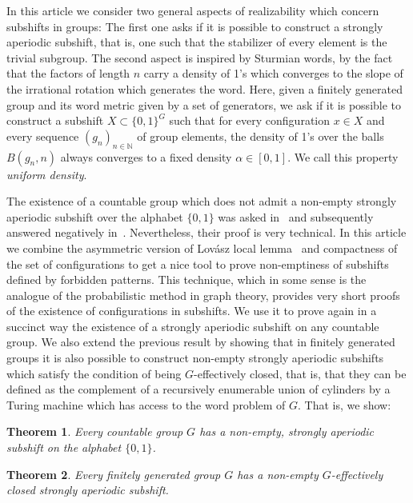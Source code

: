\documentclass[letterpaper]{article}
\theoremstyle{plain}
\newtheorem{theorem}{Theorem}[section]
\def\NN{\mathbb{N}}
\newcommand{\cor}[2][]{#2}
\begin{document}
	\bigskip
	
	In this article we consider two general aspects of realizability which concern subshifts in groups: The first one asks if it is possible to construct a strongly aperiodic subshift, that is, one such that the stabilizer of every element is the trivial subgroup. The second aspect is inspired by Sturmian words, by the fact that the factors of length $n$ carry a density of 1's which converges to the slope of the irrational rotation which generates the word. Here, given a finitely generated group and its word metric given by a set of generators, we ask if \cor[it's]{it is} possible to construct a subshift $X \subset \{0,1\}^G$ such that for every configuration $x \in X$ and every sequence $(g_n)_{n \in \NN}$ of group elements, the density of 1's over the balls $B(g_n,n)$ always converges to a fixed density $\alpha \in [0,1].$ We call this property \emph{uniform density}.
	
	The existence of a countable group which does not admit a non-empty strongly aperiodic subshift over the alphabet $\{0,1\}$ was asked in~\cite{glasner2009} and subsequently answered negatively in~\cite{gao2009}. Nevertheless, their proof is very technical. In this article we combine the asymmetric version of Lov\'asz local lemma~\cite{AlonSpencer2008} and compactness of the set of configurations to get a nice tool to prove non-emptiness of subshifts defined by forbidden patterns. This technique, which in some sense is the analogue of the probabilistic method in graph theory, provides very short proofs of the existence of configurations in subshifts. We use it to prove again in a succinct way the existence of a strongly aperiodic subshift on any countable group. We also extend the previous result by showing that in finitely generated groups it is also possible to construct non-empty strongly aperiodic subshifts which satisfy the condition of being $G$-effectively closed, that is, that they can be defined as 
the complement of a recursively enumerable union of cylinders by a Turing machine which has access to the word problem of $G$. That is, we show:
	
	
	{
		\renewcommand{\thetheorem}{\ref{theorem.free_subflow}}
		\begin{theorem}
		Every countable group $G$ has a non-empty, strongly aperiodic subshift on the alphabet $\{0,1\}$.
		\end{theorem}
		\addtocounter{theorem}{-1}
	}
	
	
	{
		\renewcommand{\thetheorem}{\ref{theorem.strongly_aperiodic1}}
		\begin{theorem}
			Every finitely generated group $G$ has a non-empty $G$-effectively closed strongly aperiodic subshift.
		\end{theorem}
		\addtocounter{theorem}{-1}
	}	
	
\end{document}
